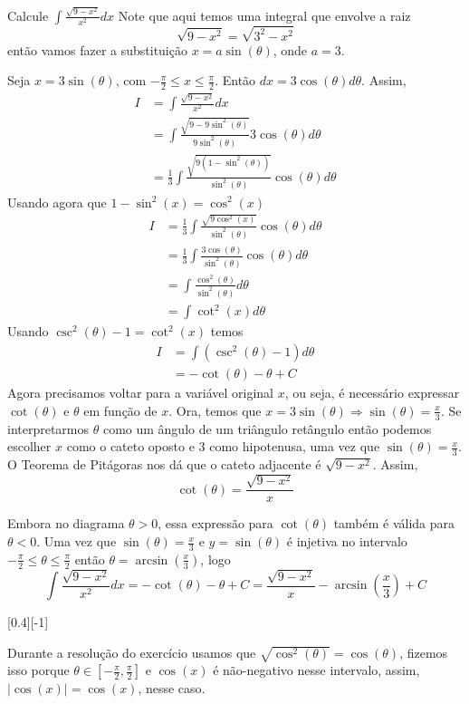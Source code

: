 \begin{example}
  Calcule \(\int \frac{\sqrt{9-x^2}}{x^2}dx\)
  \solution
  Note que aqui temos uma integral que envolve a raiz
  \[
    \sqrt{9-x^2} = \sqrt{3^2-x^2}
  \]
  então vamos fazer a substituição
  $x=a \sin(\theta)$, onde $a=3$.

  Seja $x= 3\sin(\theta)$, com
  \(-\frac{\pi}{2} \leq x \leq \frac{\pi}{2}\).
  Então $dx=3 \cos(\theta) d\theta$.
  Assim,
  \begin{align*}
    I
    & = \int \frac{\sqrt{9-x^2}}{x^2}dx \\
    & = \int \frac{\sqrt{9-9\sin^2(\theta)}}{9 \sin^2(\theta)} 3 \cos(\theta) d\theta \\
    & = \frac{1}{3}\int \frac{\sqrt{9(1-\sin^2(\theta))}}{ \sin^2(\theta)} \cos(\theta) d\theta
  \end{align*}
  Usando agora que
  \(1-\sin^2(x)= \cos^2(x)\)
  \begin{align*}
    I
    & = \frac{1}{3}\int \frac{\sqrt{9\cos^2(x)}}{ \sin^2(\theta)} \cos(\theta) d\theta \\
    & = \frac{1}{3}\int \frac{3\cos(\theta)}{\sin^2(\theta)}\cos(\theta) d\theta  \\
    & = \int \frac{\cos^2(\theta)}{\sin^2(\theta)} d\theta \\
    & = \int \cot^2(x) d\theta
  \end{align*}
  Usando
  \(\csc^2(\theta)-1 = \cot^2(x)\)
  temos
  \begin{align*}
  I
    & =  \int (\csc^2(\theta)-1) d \theta  \\
    & = -\cot(\theta)- \theta +C
  \end{align*}
  Agora precisamos voltar para a variável original $x$, ou seja, é necessário
  expressar $\cot(\theta)$ e $\theta$ em função de $x$. Ora, temos que
  $x=3\sin(\theta) \Rightarrow \sin(\theta)= \frac{x}{3}$. Se interpretarmos
  $\theta$ como um ângulo de um triângulo retângulo então podemos escolher $x$
  como o cateto oposto e $3$ como hipotenusa, uma vez que
  $\sin(\theta)=\frac{x}{3}$.
  O Teorema de Pitágoras nos dá que o cateto adjacente é
  $\sqrt{9-x^2}$. Assim,
  \[
    \cot(\theta)= \frac{\sqrt{9-x^2}}{x}
  \]

  Embora no diagrama $\theta >0$, essa expressão para $\cot(\theta)$ também é
  válida para $\theta <0$. Uma vez que $\sin(\theta)= \frac{x}{3}$ e
  $y=\sin(\theta)$ é injetiva no intervalo
  $-\frac{\pi}{2} \leq \theta \leq\frac{\pi}{2}$
  então $\theta = \arcsin(\frac{x}{3})$, logo
  \[
    \int \frac{\sqrt{9-x^2}}{x^2}dx
    = -\cot(\theta)-\theta+C
    = \frac{\sqrt{9-x^2}}{x}-\arcsin\left(\frac{x}{3}\right)+C
  \]

  [0.4][-1]
\end{example}
Durante a resolução do exercício usamos que $\sqrt{\cos^2(\theta)}=
\cos(\theta)$, fizemos isso porque $\theta \in [-\frac{\pi}{2}, \frac{\pi}{2}]$
e $\cos(x)$ é não-negativo nesse intervalo, assim, $|\cos(x)|= \cos(x)$, nesse
caso.

